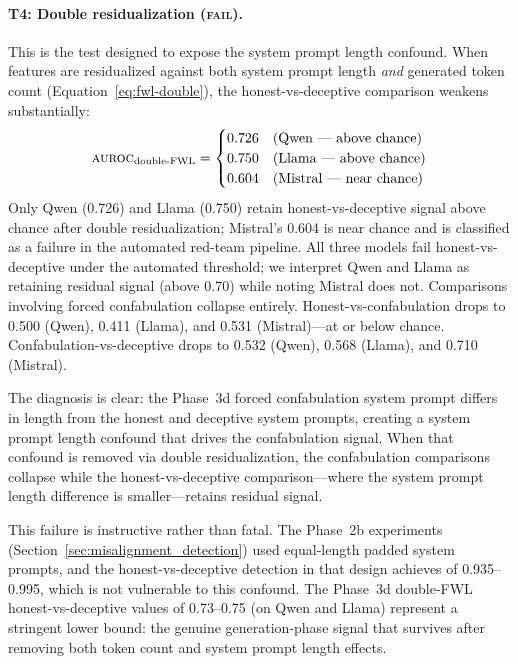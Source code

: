 \paragraph{T4: Double residualization (\textsc{fail}).}
This is the test designed to expose the system prompt length confound.
When features are residualized against both system prompt length \emph{and} generated token count (Equation~\ref{eq:fwl-double}), the honest-vs-deceptive comparison weakens substantially:
\begin{equation*}
  \text{\textsc{auroc}}_{\text{double-FWL}} =
  \begin{cases}
    0.726 & \text{(Qwen --- above chance)} \\
    0.750 & \text{(Llama --- above chance)} \\
    0.604 & \text{(Mistral --- near chance)}
  \end{cases}
\end{equation*}
Only Qwen (0.726) and Llama (0.750) retain honest-vs-deceptive signal above chance after double residualization; Mistral's 0.604 is near chance and is classified as a failure in the automated red-team pipeline.
All three models fail honest-vs-deceptive under the automated threshold; we interpret Qwen and Llama as retaining residual signal (above 0.70) while noting Mistral does not.
Comparisons involving forced confabulation collapse entirely.
Honest-vs-confabulation \auroc drops to 0.500 (Qwen), 0.411 (Llama), and 0.531 (Mistral)---at or below chance.
Confabulation-vs-deceptive \auroc drops to 0.532 (Qwen), 0.568 (Llama), and 0.710 (Mistral).

The diagnosis is clear: the Phase~3d forced confabulation system prompt differs in length from the honest and deceptive system prompts, creating a system prompt length confound that drives the confabulation signal.
When that confound is removed via double residualization, the confabulation comparisons collapse while the honest-vs-deceptive comparison---where the system prompt length difference is smaller---retains residual signal.

This failure is instructive rather than fatal.
The Phase~2b experiments (Section~\ref{sec:misalignment_detection}) used equal-length padded system prompts, and the honest-vs-deceptive detection in that design achieves \fwl \auroc of 0.935--0.995, which is not vulnerable to this confound.
The Phase~3d double-FWL honest-vs-deceptive values of 0.73--0.75 (on Qwen and Llama) represent a stringent lower bound: the genuine generation-phase signal that survives after removing both token count and system prompt length effects.

